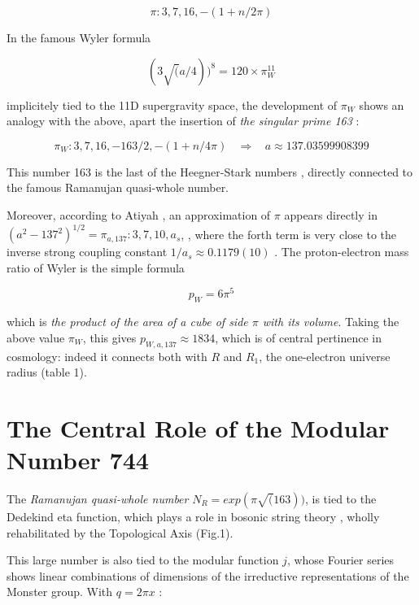 \documentclass[a4paper,9pt]{article}
\begin{document}
\begin{equation}
\pi : 3, 7, 16, -(1+n/2\pi)
\end{equation}


In the famous Wyler formula \cite{Wyler} 

\begin{equation}
(3\sqrt(a/4))^8 = 120 \times \pi_W^{11}
\end{equation}


implicitely tied to the 11D supergravity space, the development of  $\pi_W$ shows an analogy with the above, apart the insertion of \textit {the singular prime 163} :

\begin{equation}
\pi_W : 3, 7, 16,- 163/2, -(1+n/4\pi) ~~~~\Rightarrow ~~~~    a \approx 137.03599908399
\end{equation}


This number 163 is the last of the Heegner-Stark numbers \cite{Stark}, directly connected to the famous Ramanujan quasi-whole number.


Moreover, according to Atiyah \cite{Atiyah1}, an approximation of $\pi$ appears directly in $(a^2-137^2)^{1/2} = \pi_{a,137} : 3, 7, 10, a_s$, , where the forth term is very close to the inverse strong coupling constant $1/a_s \approx 0.1179(10)$ \cite{Tanabashi}. The proton-electron mass ratio of Wyler \cite{Wyler} is the simple formula 

\begin{equation}
 p_W = 6\pi^5    
\end{equation}

which is \textit {the product of the area of a cube of side $\pi$ with its volume}. Taking the above value $\pi_W$, this gives $p_{W, a, 137} \approx 1834$, which is of central pertinence in cosmology: indeed it connects both with $R$ and $R_1$, the one-electron universe radius \cite{Sanchez} (table 1).

\section{The Central Role of the Modular Number 744}

The \textit{Ramanujan quasi-whole number} $N_R = exp(\pi\sqrt(163))$, is tied to the Dedekind eta function, which plays a role in bosonic string theory \cite{Apostol}\cite{Lovelace}, wholly rehabilitated by the Topological Axis (Fig.1).

This large number is also tied to the modular function $j$, whose Fourier series shows linear combinations of dimensions of the irreductive representations of the Monster group. With $q = 2\pi x$ :
\end{document}

